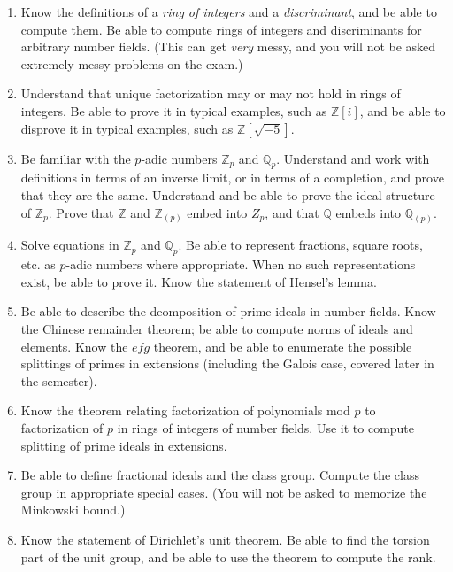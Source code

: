 \documentclass[12pt]{article}
\newcommand{\Q}{\mathbb{Q}}
\newcommand{\Z}{\mathbb{Z}}
\begin{document}
\begin{enumerate}
\item
Know the definitions of a {\itshape ring of integers} and a {\itshape discriminant}, and be able to compute them.
Be able to compute rings of integers and discriminants for arbitrary number fields. (This can get {\itshape very}
messy, and you will not be asked extremely messy problems on the exam.)

\item
Understand that unique factorization may or may not hold in rings of integers. Be able to prove it in typical
examples, such as $\Z[i]$, and be able to disprove it in typical examples, such as $\Z[\sqrt{-5}]$.

\item
Be familiar with the $p$-adic numbers $\Z_p$ and $\Q_p$. Understand and work with definitions in terms of an
inverse limit, or in terms of a completion, and prove that they are the same. Understand and be able to prove
the ideal structure of $\Z_p$. Prove that $\Z$ and $\Z_{(p)}$ embed into $Z_p$, and that $\Q$ embeds into $\Q_{(p)}$.

\item
Solve equations in $\Z_p$ and $\Q_p$. Be able to represent fractions, square roots, etc. as $p$-adic
numbers where appropriate. When no such representations exist, be able to prove it. Know the statement of Hensel's lemma.

\item
Be able to describe the deomposition of prime ideals in number fields. Know the Chinese remainder theorem; be able
to compute norms of ideals and elements. Know the $efg$ theorem, and be able to enumerate the possible splittings of
primes in extensions (including the Galois case, covered later in the semester).

\item
Know the theorem relating factorization of polynomials mod $p$ to factorization of $p$ in rings of integers of number fields.
Use it to compute splitting of prime ideals in extensions. 

\item
Be able to define fractional ideals and the class group. Compute the class group in appropriate special cases. (You will
not be asked to memorize the Minkowski bound.)

\item
Know the statement of Dirichlet's unit theorem. Be able to find the torsion part of the unit group, and be able to use the
theorem to compute the rank. 


\end{enumerate}
\end{document}
